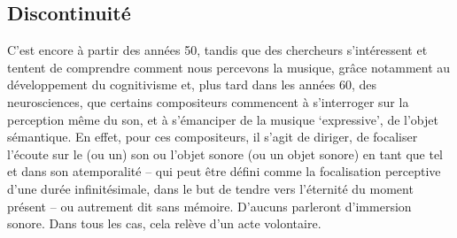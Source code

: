\documentclass{article}
\begin{document}


\subsection{Discontinuité}


C'est encore à partir des années 50, tandis que des chercheurs s'intéressent et tentent de comprendre comment nous percevons la musique, grâce notamment au développement du cognitivisme et, plus tard dans les années 60, des neurosciences, que certains compositeurs commencent à s'interroger sur la perception même du son, et à s'émanciper de la musique `expressive', de l'objet sémantique. En effet, pour ces compositeurs, il s'agit de diriger, de focaliser l'écoute sur le (ou un) son ou l'objet sonore (ou un objet sonore) en tant que tel et dans son atemporalité -- qui peut être défini comme la focalisation perceptive d'une durée infinitésimale, dans le but de tendre vers l'éternité du moment présent -- ou autrement dit sans mémoire. D'aucuns parleront d'immersion sonore. Dans tous les cas, cela relève d'un acte volontaire.
\end{document}
